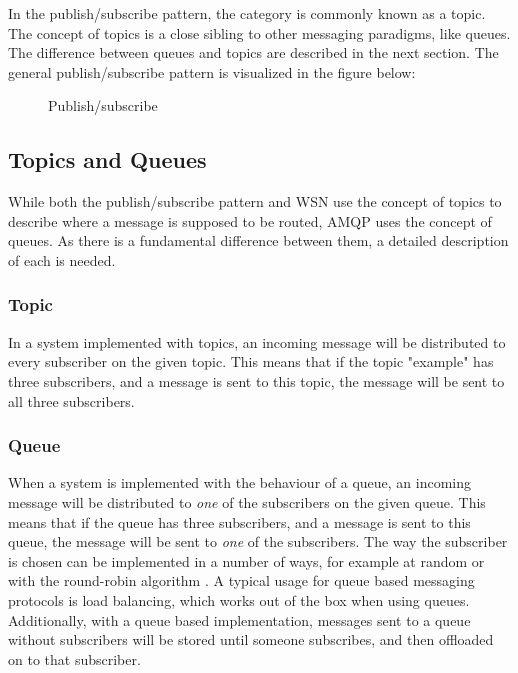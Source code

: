 In the publish/subscribe pattern, the category is commonly known as a topic. The concept of topics is a close sibling to other messaging paradigms, like queues. The difference between queues and topics are described in the next section. The general publish/subscribe pattern is visualized in the figure \cite{pub-sub-image} below:

\begin{center}
  \begin{figure}[ht]
    \caption{Publish/subscribe}
    \label{fig:publish-subscribe}
  \end{figure}
\end{center}

\subsection{Topics and Queues}
\label{subsec:architecture_and_implementation-topic_and_queue_differecnce}
While both the publish/subscribe pattern and WSN use the concept of topics to describe where a message is supposed to be routed, AMQP uses the concept of queues. As there is a fundamental difference between them, a detailed description of each is needed.

\subsubsection{Topic}
In a system implemented with topics, an incoming message will be distributed to every subscriber on the given topic. This means that if the topic "example" has three subscribers, and a message is sent to this topic, the message will be sent to all three subscribers.

\subsubsection{Queue}
When a system is implemented with the behaviour of a queue, an incoming message will be distributed to \textit{one} of the subscribers on the given queue. This means that if the queue has three subscribers, and a message is sent to this queue, the message will be sent to \textit{one} of the subscribers. The way the subscriber is chosen can be implemented in a number of ways, for example at random or with the round-robin algorithm \cite{round-robin}. A typical usage for queue based messaging protocols is load balancing, which works out of the box when using queues. Additionally, with a queue based implementation, messages sent to a queue without subscribers will be stored until someone subscribes, and then offloaded on to that subscriber.

